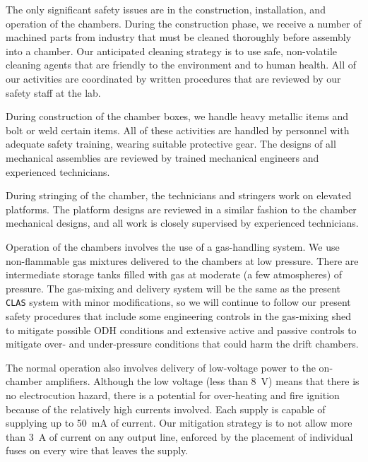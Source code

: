 The only significant safety issues are in the construction, installation, 
and operation of the chambers.  During the construction phase, we receive 
a number of machined parts from industry that must be cleaned thoroughly 
before assembly into a chamber.  Our anticipated cleaning strategy is to 
use safe, non-volatile cleaning agents that are friendly to the environment 
and to human health.  All of our activities are coordinated by written 
procedures that are reviewed by our safety staff at the lab.

During construction of the chamber boxes, we handle heavy metallic items and 
bolt or weld certain items.  All of these activities are handled by personnel 
with adequate safety training, wearing suitable protective gear.  The designs 
of all mechanical assemblies are reviewed by trained mechanical engineers and 
experienced technicians.

During stringing of the chamber, the technicians and stringers work on 
elevated platforms.  The platform designs are reviewed in a similar fashion 
to the chamber mechanical designs, and all work is closely supervised by 
experienced technicians.

Operation of the chambers involves the use of a gas-handling system.  We use 
non-flammable gas mixtures delivered to the chambers at low pressure.  There 
are intermediate storage tanks filled with gas at moderate (a few atmospheres)
of pressure.  The gas-mixing and delivery system will be the same as the 
present {\tt CLAS} system with minor modifications, so we will continue to 
follow our present safety procedures that include some engineering controls 
in the gas-mixing shed to mitigate possible ODH conditions and extensive 
active and passive controls to mitigate over- and under-pressure conditions 
that could harm the drift chambers.

The normal operation also involves delivery of low-voltage power to the 
on-chamber amplifiers.  Although the low voltage (less than 8~V) means that 
there is no electrocution hazard, there is a potential for over-heating and 
fire ignition because of the relatively high currents involved.  Each supply 
is capable of supplying up to 50~mA of current.  Our mitigation strategy is 
to not allow more than 3~A of current on any output line, enforced by the 
placement of individual fuses on every wire that leaves the supply. 

